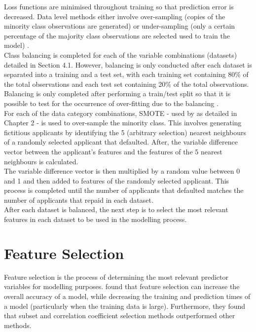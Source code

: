 \vspace{10pt}


Loss functions are minimised throughout training so that prediction error is decreased. Data level methods either involve over-sampling (copies of the minority class observations are generated) or under-sampling (only a certain percentage of the majority class observations are selected used to train the model) \parencite{Balancing1}. \\

Class balancing is completed for each of the variable combinations (datasets) detailed in Section 4.1. However, balancing is only conducted after each dataset is separated into a training and a test set, with each training set containing 80\% of the total observations and each test set containing 20\% of the total observations. Balancing is only completed after performing a train/test split so that it is possible to test for the occurrence of over-fitting due to the balancing \parencite{Balancing2}. \\

For each of the data category combinations, SMOTE - used by \textcite{NNShen} as detailed in Chapter 2 - is used to over-sample the minority class. This involves generating fictitious applicants by identifying the 5 (arbitrary selection) nearest neighbours of a randomly selected applicant that defaulted. After, the variable difference vector between the applicant's features and the features of the 5 nearest neighbours is calculated. \\

The variable difference vector is then multiplied by a random value between 0 and 1 and then added to features of the randomly selected applicant. This process is completed until the number of applicants that defaulted matches the number of applicants that repaid in each dataset. \\

After each dataset is balanced, the next step is to select the most relevant features in each dataset to be used in the modelling process. \\

\section{Feature Selection}

Feature selection is the process of determining the most relevant predictor variables for modelling purposes. \textcite{FeatureSelection} found that feature selection can increase the overall accuracy of a model, while decreasing the training and prediction times of a model (particularly when the training data is large). Furthermore, they found that subset and correlation coefficient selection methods outperformed other methods. \\

